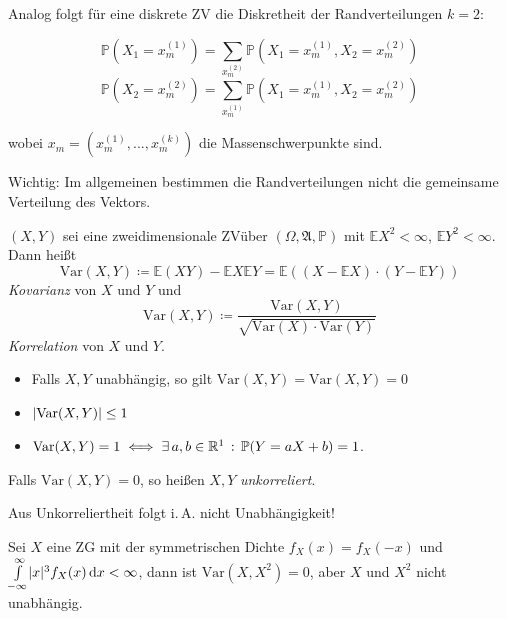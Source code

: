 \documentclass{cheat-sheet}
\newcommand{\Alg}{\mathfrak{A}} %
\renewcommand{\P}{\mathbb{P}} %
\newcommand{\E}{\mathbb{E}} %
\newcommand{\Var}{\mathrm{Var}} %
\newcommand{\cov}{\mathrm{Var}} %
\newcommand{\cor}{\mathrm{Var}} %
\begin{document}
Analog folgt für eine diskrete ZV die Diskretheit der Randverteilungen $k=2$:

\[ \P(X_1 = x_m^{(1)}) = \sum_{x_m^{(2)}} \P(X_1 = x_m^{(1)}, X_2 = x_m^{(2)}) \]
\[ \P(X_2 = x_m^{(2)}) = \sum_{x_m^{(1)}} \P(X_1 = x_m^{(1)}, X_2 = x_m^{(2)}) \]

wobei $x_m = (x_m^{(1)}, ..., x_m^{(k)})$ die Massenschwerpunkte sind.

Wichtig: Im allgemeinen bestimmen die Randverteilungen nicht die gemeinsame Verteilung des Vektors.



\begin{defn}
  $(X, Y)$ sei eine zweidimensionale ZVüber $(\Omega, \Alg, \P)$ mit $\E X^2 < \infty$, $\E Y^2 < \infty$. Dann heißt
  \[ \cov(X, Y) \coloneqq \E(XY) - \E X \E Y = \E ((X - \E X) \cdot (Y - \E Y)) \]
  \emph{Kovarianz} von $X$ und $Y$ und
  \[ \cor(X, Y) \coloneqq \frac{\cov(X, Y)}{\sqrt{\Var(X) \cdot \Var(Y)}} \]
  \emph{Korrelation} von $X$ und $Y$.
\end{defn}

\begin{satz}
  \begin{itemize}
    \item Falls $X, Y$ unabhängig, so gilt $\cov(X, Y) = \cor(X, Y) = 0$
    \item $\abs{\cor(X, Y)} \leq 1$
    \item $\cor(X, Y) = 1 \iff \exists \, a, b \in \R^1 \,:\, \P(Y = aX + b) = 1$.
  \end{itemize}
\end{satz}

\begin{defn}
  Falls $\cor(X, Y) = 0$, so heißen $X, Y$ \emph{unkorreliert}.
\end{defn}

\begin{acht}
  Aus Unkorreliertheit folgt i.\,A. nicht Unabhängigkeit!
\end{acht}

\begin{bsp}
  Sei $X$ eine ZG mit der symmetrischen Dichte $f_X(x) = f_X(-x)$ und ${\textstyle \int\limits_{-\infty}^{\infty}} \lvert x\rvert^3 f_X(x) \,\mathrm{d} x < \infty$, dann ist $\cov(X, X^2) = 0$, aber $X$ und $X^2$ nicht unabhängig.
\end{bsp}
\end{document}
